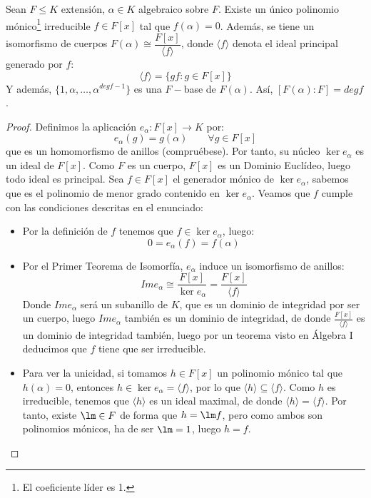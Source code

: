 \begin{prop}\label{prop:pol_irreducible}
    Sean $F\leq K$ extensión, $\alpha\in K$ algebraico sobre $F$. Existe un único polinomio mónico\footnote{El coeficiente líder es 1.} irreducible $f\in F[x]$ tal que $f(\alpha)=0$. Además, se tiene un isomorfismo de cuerpos $F(\alpha)\cong \dfrac{F[x]}{\langle f \rangle }$, donde $\langle f \rangle $ denota el ideal principal generado por $f$:
    \begin{equation*}
        \langle f \rangle  = \{gf : g\in F[x]\}
    \end{equation*}
    Y además, $\{1,\alpha, \ldots, \alpha^{deg f - 1}\}$ es una $F-$base de $F(\alpha)$. Así, $[F(\alpha): F] = degf$.
    \begin{proof} 
        Definimos la aplicación $e_\alpha:F[x]\to K$ por:
        \begin{equation*}
            e_\alpha(g) = g(\alpha) \qquad \forall g\in F[x]
        \end{equation*}
        que es un homomorfismo de anillos (compruébese). Por tanto, su núcleo $\ker e_\alpha$ es un ideal de $F[x]$. Como $F$ es un cuerpo, $F[x]$ es un Dominio Euclídeo, luego todo ideal es principal. Sea $f\in F[x]$ el generador mónico de $\ker e_{\alpha}$, sabemos que es el polinomio de menor grado contenido en $\ker e_{\alpha}$. Veamos que $f$ cumple con las condiciones descritas en el enunciado:
        \begin{itemize}
            \item Por la definición de $f$ tenemos que $f\in \ker e_\alpha$, luego:
                \begin{equation*}
                    0 = e_\alpha(f) = f(\alpha)
                \end{equation*}
            \item Por el Primer Teorema de Isomorfía, $e_{\alpha}$ induce un isomorfismo de anillos:
                \begin{equation*}
                    Im e_\alpha \cong \dfrac{F[x]}{\ker e_\alpha} = \dfrac{F[x]}{\langle f \rangle }
                \end{equation*}
                Donde $Im e_{\alpha}$ será un subanillo de $K$, que es un dominio de integridad por ser un cuerpo, luego $Im e_{\alpha}$ también es un dominio de integridad, de donde $\frac{F[x]}{\langle f \rangle }$ es un dominio de integridad también, luego por un teorema visto en Álgebra I deducimos que $f$ tiene que ser irreducible.
            \item Para ver la unicidad, si tomamos $h\in F[x]$ un polinomio mónico tal que $h(\alpha)=0$, entonces $h\in \ker e_\alpha = \langle f \rangle $, por lo que $\langle h \rangle \subseteq \langle f \rangle $. Como $h$ es irreducible, tenemos que $\langle h \rangle $ es un ideal maximal, de donde $\langle h \rangle  = \langle f \rangle $. Por tanto, existe $\lm\in F$ de forma que $h=\lm f$, pero como ambos son polinomios mónicos, ha de ser $\lm = 1$, luego $h = f$.

\end{itemize}
\end{proof}
\end{prop}
